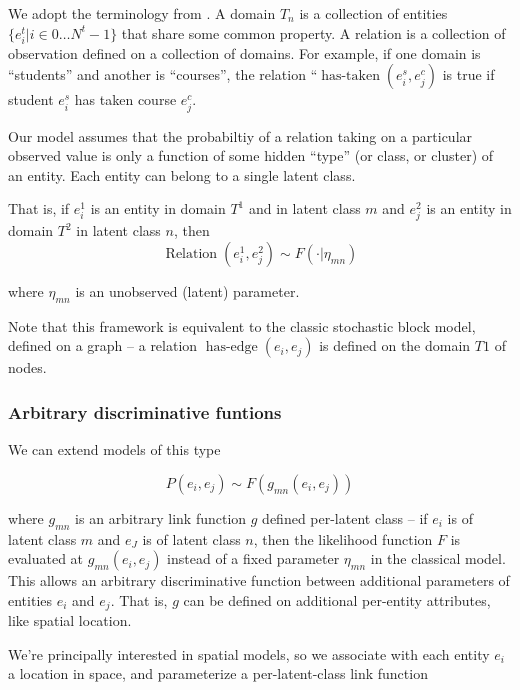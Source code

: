 \documentclass{article}
\begin{document}
We adopt the terminology from \autocite{Kemp}. A domain $T_n$ is a
collection of entities $\{e^t_i | i \in 0 \dots N^t -1 \} $ that share
some common property. A relation is a collection of observation
defined on a collection of domains. For example, if one domain is
``students'' and another is ``courses'', the relation
``$\operatorname{has-taken}(e^s_i, e^c_j)$ is true if student $e^s_i$ has
taken course $e^c_j$. 

Our model assumes that the probabiltiy of a relation taking on a
particular observed value is only a function of some hidden ``type''
(or class, or cluster) of an entity. Each entity can belong to a
single latent class.

That is, if $e^1_i$ is an entity
in domain $T^1$ and in latent class $m$ and $e^2_j$ is an entity in
domain $T^2$ in latent class $n$, then 
\begin{equation}
\operatorname{Relation}(e^1_i, e^2_j) \sim F(\cdot | \eta_{mn})
\end{equation}

where $\eta_{mn}$ is an unobserved (latent) parameter.

Note that this framework is equivalent to the classic stochastic block
model, defined on a graph -- a relation $\operatorname{has-edge}(e_i,
e_j)$ is defined on the domain $T1$ of nodes. 

\subsubsection{Arbitrary discriminative funtions}
We can extend models of this type 

\begin{equation}
P(e_i, e_j) \sim F(g_{mn}(e_i, e_j))
\end{equation}

where $g_{mn}$ is an arbitrary link function $g$ defined per-latent
class -- if $e_i$ is of latent class $m$ and $e_J$ is of latent class
$n$, then the likelihood function $F$ is evaluated at $g_{mn}(e_i,
e_j)$ instead of a fixed parameter $\eta_{mn}$ in the classical
model. This allows an arbitrary discriminative function between
additional parameters of entities $e_i$ and $e_j$. That is, $g$ can be
defined on additional per-entity attributes, like spatial location.

We're principally interested in spatial models, so we associate with each
entity $e_i$ a location in space, and parameterize a per-latent-class
link function 
\end{document}

